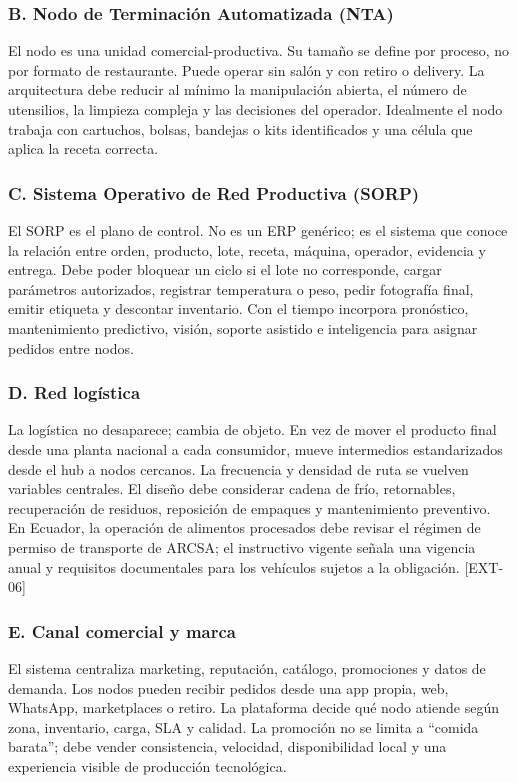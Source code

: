 \documentclass[11pt,a4paper]{article}
\begin{document}
\subsubsection*{B. Nodo de Terminación Automatizada (NTA)}
El nodo es una unidad comercial-productiva. Su tamaño se define por proceso, no por formato de
restaurante. Puede operar sin salón y con retiro o delivery. La arquitectura debe reducir al mínimo la
manipulación abierta, el número de utensilios, la limpieza compleja y las decisiones del operador.
Idealmente el nodo trabaja con cartuchos, bolsas, bandejas o kits identificados y una célula que aplica la
receta correcta.

\subsubsection*{C. Sistema Operativo de Red Productiva (SORP)}
El SORP es el plano de control. No es un ERP genérico; es el sistema que conoce la relación entre orden,
producto, lote, receta, máquina, operador, evidencia y entrega. Debe poder bloquear un ciclo si el lote no
corresponde, cargar parámetros autorizados, registrar temperatura o peso, pedir fotografía final, emitir
etiqueta y descontar inventario. Con el tiempo incorpora pronóstico, mantenimiento predictivo, visión,
soporte asistido e inteligencia para asignar pedidos entre nodos.

\subsubsection*{D. Red logística}
La logística no desaparece; cambia de objeto. En vez de mover el producto final desde una planta nacional
a cada consumidor, mueve intermedios estandarizados desde el hub a nodos cercanos. La frecuencia y
densidad de ruta se vuelven variables centrales. El diseño debe considerar cadena de frío, retornables,
recuperación de residuos, reposición de empaques y mantenimiento preventivo. En Ecuador, la operación de
alimentos procesados debe revisar el régimen de permiso de transporte de ARCSA; el instructivo vigente
señala una vigencia anual y requisitos documentales para los vehículos sujetos a la obligación. [EXT-06]

\subsubsection*{E. Canal comercial y marca}
El sistema centraliza marketing, reputación, catálogo, promociones y datos de demanda. Los nodos pueden
recibir pedidos desde una app propia, web, WhatsApp, marketplaces o retiro. La plataforma decide qué nodo
atiende según zona, inventario, carga, SLA y calidad. La promoción no se limita a “comida barata”; debe
vender consistencia, velocidad, disponibilidad local y una experiencia visible de producción tecnológica.
\end{document}
